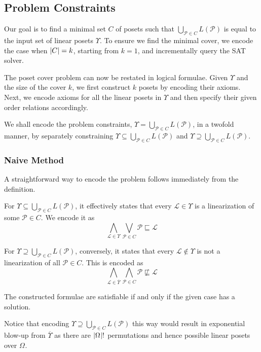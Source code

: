\documentclass{llncs}
\DeclarePairedDelimiter{\abs}{\lvert}{\rvert}
\newcommand{\poset}[1]{\mathcal{#1}}
\newcommand{\uni}[1][]{\Omega_{#1}}
\newcommand{\lang}[1]{L(#1)}
\newcommand{\lext}{\sqsubseteq}
\newcommand{\complmt}[1]{\overline{#1}}
\begin{document}
\subsection{Problem Constraints}
Our goal is to find a minimal set $C$ of posets such that $\bigcup_{\poset{P} \in C} \lang{\poset{P}}$ is equal to the input set of linear posets $\Upsilon$. To ensure we find the minimal cover, we encode the case when $\abs{C} = k$, starting from $k = 1$, and incrementally query the SAT solver.

The poset cover problem can now be restated in logical formulae. Given $\Upsilon$ and the size of the cover $k$, we first construct $k$ posets by encoding their axioms. Next, we encode axioms for all the linear posets in $\Upsilon$ and then specify their given order relations accordingly.

We shall encode the problem constraints, $\Upsilon = \bigcup_{\poset{P} \in C} \lang{\poset{P}}$, in a twofold manner, by separately constraining $\Upsilon \subseteq \bigcup_{\poset{P} \in C} \lang{\poset{P}}$ and $\Upsilon \supseteq \bigcup_{\poset{P} \in C} \lang{\poset{P}}$.

\subsubsection{Naive Method} A straightforward way to encode the problem follows immediately from the definition.

For $\Upsilon \subseteq \bigcup_{\poset{P} \in C} \lang{\poset{P}}$, it effectively states that every $\poset{L} \!\in\! \Upsilon$ is a linearization of some $\poset{P} \!\in\! C$. We encode it as
\[
\bigwedge_{\poset{L} \in \Upsilon} \bigvee_{\poset{P} \in C} \poset{P} \lext \poset{L}
\]

For $\Upsilon \supseteq \bigcup_{\poset{P} \in C} \lang{\poset{P}}$, conversely, it states that every $\poset{L} \!\notin\! \Upsilon$ is not a linearization of all $\poset{P} \!\in\! C$. This is encoded as
\[
\bigwedge_{\poset{L} \in \complmt{\Upsilon}} \bigwedge_{\poset{P} \in C} \poset{P} \not\lext \poset{L}
\]

\begin{theorem}
    The constructed formulae are satisfiable if and only if the given case has a solution.
\end{theorem}

Notice that encoding $\Upsilon \supseteq \bigcup_{\poset{P} \in C} \lang{\poset{P}}$ this way would result in exponential blow-up from $\complmt{\Upsilon}$ as there are $\abs{\uni}!$ permutations and hence possible linear posets over $\uni$.
\end{document}
